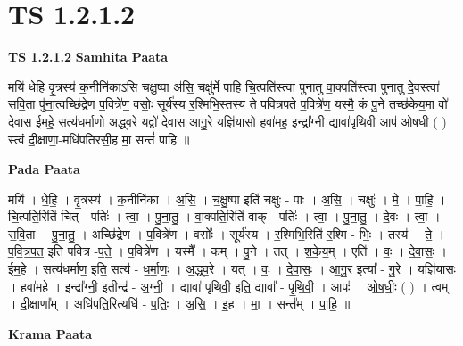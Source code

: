 \documentclass[17pt]{extarticle}
\begin{document}
\section{ TS 1.2.1.2 }

\textbf{TS 1.2.1.2 } \newline
\textbf{Samhita Paata} \newline

मयि॑ धेहि वृ॒त्रस्य॑ क॒नीनि॑काऽसि चक्षु॒ष्पा अ॑सि॒ चक्षु॑र्मे पाहि चि॒त्पति॑स्त्वा पुनातु वा॒क्पति॑स्त्वा पुनातु दे॒वस्त्वा॑ सवि॒ता पु॑ना॒त्वच्छि॑द्रेण प॒वित्रे॑ण॒ वसोः॒ सूर्य॑स्य र॒श्मिभि॒स्तस्य॑ ते पवित्रपते प॒वित्रे॑ण॒ यस्मै॒ कं पु॒ने तच्छ॑केय॒मा वो॑ देवास ईमहे॒ सत्य॑धर्माणो अद्ध्व॒रे यद्वो॑ देवास आगु॒रे यज्ञि॑यासो॒ हवा॑मह॒ इन्द्रा᳚ग्नी॒ द्यावा॑पृथिवी॒ आप॑ ओषधी॒ ( ) स्त्वं दी॒क्षाणा॒-मधि॑पतिरसी॒ह मा॒ सन्तं॑ पाहि ॥ \newline

\textbf{Pada Paata} \newline

मयि॑ । धे॒हि॒ । वृ॒त्रस्य॑ । क॒नीनि॑का । अ॒सि॒ । च॒क्षु॒ष्पा इति॑ चक्षुः - पाः । अ॒सि॒ । चक्षुः॑ । मे॒ । पा॒हि॒ । चि॒त्पति॒रिति॑ चित् - पतिः॑ । त्वा॒ । पु॒ना॒तु॒ । वा॒क्पति॒रिति॑ वाक् - पतिः॑ । त्वा॒ । पु॒ना॒तु॒ । दे॒वः । त्वा॒ । स॒वि॒ता । पु॒ना॒तु॒ । अच्छि॑द्रेण । प॒वित्रे॑ण । वसोः᳚ । सूर्य॑स्य । र॒श्मिभि॒रिति॑ र॒श्मि - भिः॒ । तस्य॑ । ते॒ । प॒वि॒त्र॒प॒त॒ इति॑ पवित्र -प॒ते॒ । प॒वित्रे॑ण । यस्मै᳚ । कम् । पु॒ने । तत् । श॒के॒य॒म् । एति॑ । वः॒ । दे॒वा॒सः॒ । ई॒म॒हे॒ । सत्य॑धर्माण॒ इति॒ सत्य॑ - ध॒र्मा॒णः॒ । अ॒द्ध्व॒रे । यत् । वः॒ । दे॒वा॒सः॒ । आ॒गु॒र इत्या᳚ - गु॒रे । यज्ञि॑यासः । हवा॑महे । इन्द्रा᳚ग्नी॒ इतीन्द्र॑ - अ॒ग्नी॒ । द्यावा॑ पृथिवी॒ इति॒ द्यावा᳚ - पृ॒थि॒वी॒ । आपः॑ । ओ॒ष॒धीः॒ ( ) । त्वम् । दी॒क्षाणा᳚म् । अधि॑पति॒रित्यधि॑ - प॒तिः॒ । अ॒सि॒ । इ॒ह । मा॒ । सन्त᳚म् । पा॒हि॒ ॥  \newline


\textbf{Krama Paata} \newline
\end{document}
